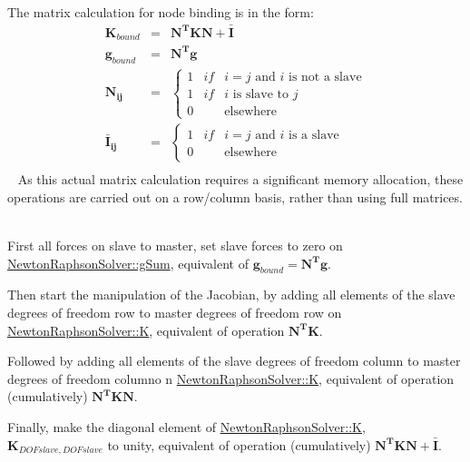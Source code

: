 The matrix calculation for node binding is in the form\+: ~\newline
 \begin{eqnarray*} \boldsymbol{K}_{bound} & = & \boldsymbol{N^{T}} \boldsymbol{K} \boldsymbol{N} + \boldsymbol{\bar{I}}\\ \boldsymbol{g}_{bound} & = & \boldsymbol{N^{T}} \boldsymbol{g} \\ \boldsymbol{N_{ij}} &= & \left\{ \begin{matrix} 1 & if & i = j \text{ and } i \text{ is not a slave}\\ 1 & if & i \text{ is slave to } j \\ 0 & & \text{elsewhere} \end{matrix} \right. \\ \boldsymbol{\bar{I}_{ij}} & = & \left\{ \begin{matrix} 1 & if & i = j \text{ and } i \text{ is a slave}\\ 0 & & \text{elsewhere} \end{matrix} \right. \\ \end{eqnarray*} ~\newline
 As this actual matrix calculation requires a significant memory allocation, these operations are carried out on a row/column basis, rather than using full matrices. ~\newline


First all forces on slave to master, set slave forces to zero on \hyperlink{classNewtonRaphsonSolver_a843bd105e92dfa1c9205e4efa134a406}{Newton\+Raphson\+Solver\+::g\+Sum}, equivalent of $ \boldsymbol{g}_{bound} = \boldsymbol{N^{T}} \boldsymbol{g} $.

Then start the manipulation of the Jacobian, by adding all elements of the slave degrees of freedom row to master degrees of freedom row on \hyperlink{classNewtonRaphsonSolver_a4e9ffc424dd37c6c00f9de3d7ac455ed}{Newton\+Raphson\+Solver\+::\+K}, equivalent of operation $ \boldsymbol{N^{T}} \boldsymbol{K} $.

Followed by adding all elements of the slave degrees of freedom column to master degrees of freedom columno n \hyperlink{classNewtonRaphsonSolver_a4e9ffc424dd37c6c00f9de3d7ac455ed}{Newton\+Raphson\+Solver\+::\+K}, equivalent of operation (cumulatively) $ \boldsymbol{N^{T}} \boldsymbol{K} \boldsymbol{N} $.

Finally, make the diagonal element of \hyperlink{classNewtonRaphsonSolver_a4e9ffc424dd37c6c00f9de3d7ac455ed}{Newton\+Raphson\+Solver\+::\+K}, $ \boldsymbol{K}_{DOFslave,DOFslave} $ to unity, equivalent of operation (cumulatively) $ \boldsymbol{N^{T}} \boldsymbol{K} \boldsymbol{N} + \boldsymbol{\bar{I}}$.\hypertarget{classNewtonRaphsonSolver_aa0ce333a40397fd113f9b9fc47bcb6ca}{}
